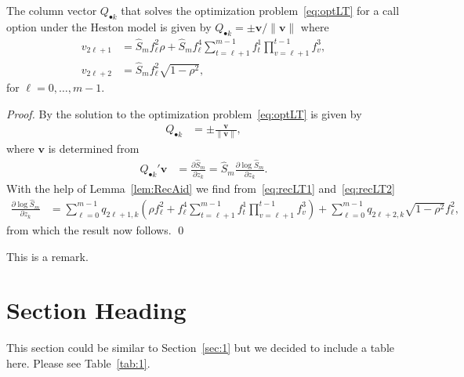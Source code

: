 \documentclass[graybox,footinfo]{svmult}
\newcommand{\bsv}{\boldsymbol{v}}    %
\begin{document}
\begin{proposition}\label{prop:optvLTc}
 The column vector $Q_{\bullet k}$ that solves the optimization problem~\eqref{eq:optLT} for a call option under the Heston model is given by $Q_{\bullet k} = \pm \bsv / \|\bsv\|$ where
\begin{align*}
  v_{2\ell+1} &= \hat{S}_m f^2_{\ell} \rho + \hat{S}_m f^4_{\ell} \sum_{t=\ell+1}^{m-1}f^1_t\prod_{v=\ell+1}^{t-1}f^3_v
  ,
  \\
   v_{2\ell+2} &= \hat{S}_m f^2_{\ell} \sqrt{1-\rho^2},
\end{align*}
for $\ell=0,\ldots,m-1$.
\end{proposition}
\begin{proof}
  By \cite[Theorem 1]{IT2006} the solution to the optimization problem~\eqref{eq:optLT} is given by
  \begin{align*}
   Q_{\bullet k}
   &=
   \pm \frac{\bsv}{\| \bsv \|}
   ,
  \end{align*}
  where $\bsv$ is determined from
  \begin{align*}
    Q_{\bullet k}' \bsv
    &=
    \frac{\partial \hat{S}_m}{\partial z_k}
    =
    \hat{S}_m \frac{\partial \log \hat{S}_m}{\partial z_k}
    .
  \end{align*}
  With the help of Lemma~\ref{lem:RecAid} we find from~\eqref{eq:recLT1} and~\eqref{eq:recLT2}
  \begin{align*}
    \frac{\partial \log \hat{S}_m}{\partial z_k}
    &=
    \sum_{\ell=0}^{m-1} q_{2\ell+1,k} \left( \rho f^2_{\ell} + f^4_{\ell} \sum_{t=\ell+1}^{m-1} f^1_t \prod_{v=\ell+1}^{t-1} f^3_v \right)
    +
    \sum_{\ell=0}^{m-1} q_{2\ell+2,k} \sqrt{1-\rho^2} f^2_{\ell}
    ,
  \end{align*}
  from which the result now follows. 
  \qed
\end{proof}

\begin{remark}
    This is a remark.
\end{remark}

\section{Section Heading}
\label{sec:2}

This section could be similar to Section~\ref{sec:1} but we decided to include a table here.
Please see Table~\ref{tab:1}.
\end{document}
